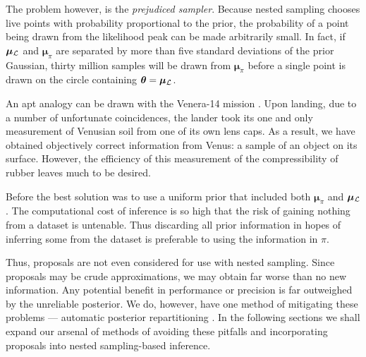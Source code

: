 \documentclass[usenatbib]{mnras}
\begin{document}
The problem however, is the \emph{prejudiced sampler}. Because nested
sampling chooses live points with probability proportional to the
prior, the probability of a point being drawn from the likelihood peak
can be made arbitrarily small. In fact, if $\bm{\mu}_{{\cal L}}$ and
$\bm{\mu}_{\pi}$ are separated by more than five standard deviations
of the prior Gaussian, thirty million samples will be drawn from
$\bm{\mu}_{\pi}$ before a single point is drawn on the circle
containing $\bm{\theta} = \bm{\mu}_{{\cal L}}$.

An apt analogy can be drawn with the Venera-14 mission
\citep{siddiqi2018beyond}. Upon landing, due to a number of
unfortunate coincidences, the lander took its one and only measurement
of Venusian soil from one of its own lens caps. As a result, we have
obtained objectively correct information from Venus: a sample of an
object on its surface. However, the efficiency of this measurement of
the compressibility of rubber leaves much to be desired. 

Before \cite{chen-ferroz-hobson} the best solution was to use a
uniform prior that included both $\bm{\mu}_{\pi}$ and
$\bm{\mu}_{{\cal L}}$. The computational cost of inference is so high
that the risk of gaining nothing from a dataset is untenable. Thus
discarding all prior information in hopes of inferring some from the
dataset is preferable to using the information in $\pi$. 

Thus, proposals are not even considered for use with nested sampling.
Since proposals may be crude approximations, we may obtain far worse
than no new information.  Any potential benefit in performance or
precision is far outweighed by the unreliable posterior.  We do,
however, have one method of mitigating these problems --- automatic
posterior repartitioning \citep{chen-ferroz-hobson}. In the following
sections we shall expand our arsenal of methods of avoiding these
pitfalls and incorporating proposals into nested sampling-based
inference.
\end{document}
